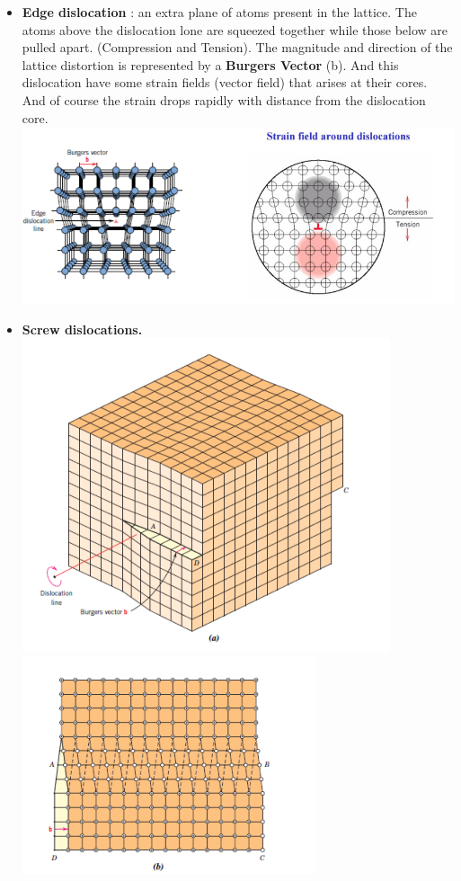 \documentclass[13]{article}
\begin{document}
\begin{itemize}
\begin{itemize}
	\item \textbf{Edge dislocation} : an extra plane of atoms present in the lattice. The atoms above the dislocation lone are squeezed together while those below are pulled apart. (Compression and Tension). The magnitude and direction of the lattice distortion is represented by a \textbf{Burgers Vector} (b). And this dislocation have some strain fields (vector field) that arises at their cores. And of course the strain drops rapidly with distance from the dislocation core.\\
		\includegraphics[scale=0.5]{figures/2.png}
	\item \textbf{Screw dislocations. } \includegraphics[scale=0.5]{figures/3.png} \includegraphics[scale=0.5]{figures/4.png}

\end{itemize}
\end{itemize}
\end{document}
